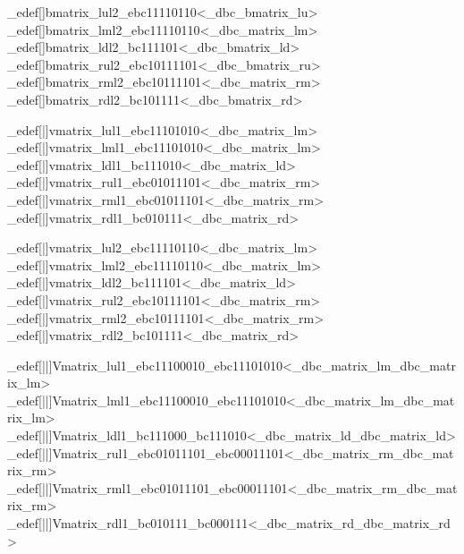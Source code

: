 \brl@char_edef[]{bmatrix_lul2}{\brl@char_ebc11110110}<\brl@char@alias_dbc_bmatrix_lu>
\brl@char_edef[]{bmatrix_lml2}{\brl@char_ebc11110110}<\brl@char@alias_dbc_matrix_lm>
\brl@char_edef[]{bmatrix_ldl2}{\brl@char_bc111101}<\brl@char@alias_dbc_bmatrix_ld>
\brl@char_edef[]{bmatrix_rul2}{\brl@char_ebc10111101}<\brl@char@alias_dbc_bmatrix_ru>
\brl@char_edef[]{bmatrix_rml2}{\brl@char_ebc10111101}<\brl@char@alias_dbc_matrix_rm>
\brl@char_edef[]{bmatrix_rdl2}{\brl@char_bc101111}<\brl@char@alias_dbc_bmatrix_rd>

\brl@char_edef[|]{vmatrix_lul1}{\brl@char_ebc11101010}<\brl@char@alias_dbc_matrix_lm>
\brl@char_edef[|]{vmatrix_lml1}{\brl@char_ebc11101010}<\brl@char@alias_dbc_matrix_lm>
\brl@char_edef[|]{vmatrix_ldl1}{\brl@char_bc111010}<\brl@char@alias_dbc_matrix_ld>
\brl@char_edef[|]{vmatrix_rul1}{\brl@char_ebc01011101}<\brl@char@alias_dbc_matrix_rm>
\brl@char_edef[|]{vmatrix_rml1}{\brl@char_ebc01011101}<\brl@char@alias_dbc_matrix_rm>
\brl@char_edef[|]{vmatrix_rdl1}{\brl@char_bc010111}<\brl@char@alias_dbc_matrix_rd>

\brl@char_edef[|]{vmatrix_lul2}{\brl@char_ebc11110110}<\brl@char@alias_dbc_matrix_lm>
\brl@char_edef[|]{vmatrix_lml2}{\brl@char_ebc11110110}<\brl@char@alias_dbc_matrix_lm>
\brl@char_edef[|]{vmatrix_ldl2}{\brl@char_bc111101}<\brl@char@alias_dbc_matrix_ld>
\brl@char_edef[|]{vmatrix_rul2}{\brl@char_ebc10111101}<\brl@char@alias_dbc_matrix_rm>
\brl@char_edef[|]{vmatrix_rml2}{\brl@char_ebc10111101}<\brl@char@alias_dbc_matrix_rm>
\brl@char_edef[|]{vmatrix_rdl2}{\brl@char_bc101111}<\brl@char@alias_dbc_matrix_rd>

\brl@char_edef[||]{Vmatrix_lul1}{\brl@char_ebc11100010\brl@char_ebc11101010}<\brl@char@alias_dbc_matrix_lm\brl@char@alias_dbc_matrix_lm>
\brl@char_edef[||]{Vmatrix_lml1}{\brl@char_ebc11100010\brl@char_ebc11101010}<\brl@char@alias_dbc_matrix_lm\brl@char@alias_dbc_matrix_lm>
\brl@char_edef[||]{Vmatrix_ldl1}{\brl@char_bc111000\brl@char_bc111010}<\brl@char@alias_dbc_matrix_ld\brl@char@alias_dbc_matrix_ld>
\brl@char_edef[||]{Vmatrix_rul1}{\brl@char_ebc01011101\brl@char_ebc00011101}<\brl@char@alias_dbc_matrix_rm\brl@char@alias_dbc_matrix_rm>
\brl@char_edef[||]{Vmatrix_rml1}{\brl@char_ebc01011101\brl@char_ebc00011101}<\brl@char@alias_dbc_matrix_rm\brl@char@alias_dbc_matrix_rm>
\brl@char_edef[||]{Vmatrix_rdl1}{\brl@char_bc010111\brl@char_bc000111}<\brl@char@alias_dbc_matrix_rd\brl@char@alias_dbc_matrix_rd>

